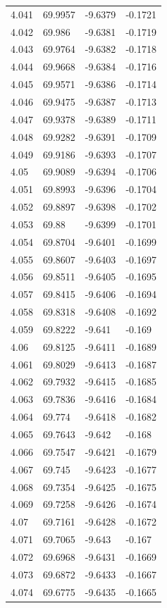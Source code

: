 \begin{tabular}{llll}
4.041 & 69.9957 & -9.6379 & -0.1721 \\
4.042 & 69.986 & -9.6381 & -0.1719 \\
4.043 & 69.9764 & -9.6382 & -0.1718 \\
4.044 & 69.9668 & -9.6384 & -0.1716 \\
4.045 & 69.9571 & -9.6386 & -0.1714 \\
4.046 & 69.9475 & -9.6387 & -0.1713 \\
4.047 & 69.9378 & -9.6389 & -0.1711 \\
4.048 & 69.9282 & -9.6391 & -0.1709 \\
4.049 & 69.9186 & -9.6393 & -0.1707 \\
4.05 & 69.9089 & -9.6394 & -0.1706 \\
4.051 & 69.8993 & -9.6396 & -0.1704 \\
4.052 & 69.8897 & -9.6398 & -0.1702 \\
4.053 & 69.88 & -9.6399 & -0.1701 \\
4.054 & 69.8704 & -9.6401 & -0.1699 \\
4.055 & 69.8607 & -9.6403 & -0.1697 \\
4.056 & 69.8511 & -9.6405 & -0.1695 \\
4.057 & 69.8415 & -9.6406 & -0.1694 \\
4.058 & 69.8318 & -9.6408 & -0.1692 \\
4.059 & 69.8222 & -9.641 & -0.169 \\
4.06 & 69.8125 & -9.6411 & -0.1689 \\
4.061 & 69.8029 & -9.6413 & -0.1687 \\
4.062 & 69.7932 & -9.6415 & -0.1685 \\
4.063 & 69.7836 & -9.6416 & -0.1684 \\
4.064 & 69.774 & -9.6418 & -0.1682 \\
4.065 & 69.7643 & -9.642 & -0.168 \\
4.066 & 69.7547 & -9.6421 & -0.1679 \\
4.067 & 69.745 & -9.6423 & -0.1677 \\
4.068 & 69.7354 & -9.6425 & -0.1675 \\
4.069 & 69.7258 & -9.6426 & -0.1674 \\
4.07 & 69.7161 & -9.6428 & -0.1672 \\
4.071 & 69.7065 & -9.643 & -0.167 \\
4.072 & 69.6968 & -9.6431 & -0.1669 \\
4.073 & 69.6872 & -9.6433 & -0.1667 \\
4.074 & 69.6775 & -9.6435 & -0.1665 \\

\end{tabular}
